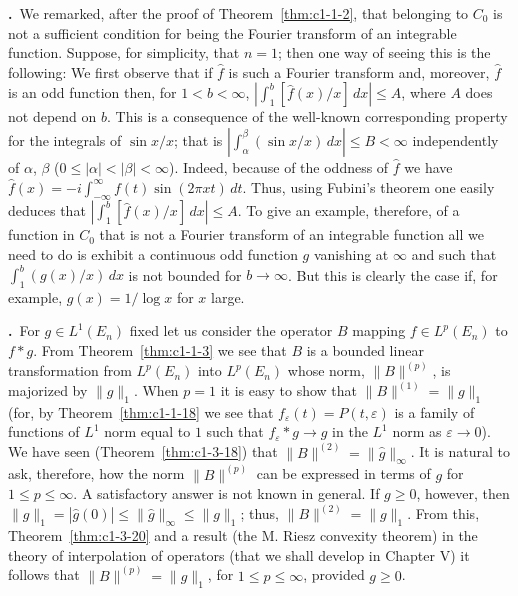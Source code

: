 \label{eq:c1-4-1}\textbf{\theequation.}~We remarked,
after the proof of Theorem~\ref{thm:c1-1-2}, that belonging to $C_{0}$ is not a
sufficient condition for being the Fourier transform of an integrable
function. Suppose, for simplicity, that $n = 1$; then one way of seeing this
is the following: We first observe that if $\hat{f}$ is such a Fourier
transform and, moreover, $\hat{f}$ is an odd function then, for
$1 < b < \infty$, $|\int_{1}^{b} [\hat{f}(x)/x] \, dx| \leq A$, where $A$ does
not depend on $b$. This is a consequence of the well-known corresponding
property for the integrals of $\sin x/x$; that is
$|\int_{\alpha}^{\beta} (\sin x/x) \, dx| \leq B < \infty$ independently of
$\alpha$, $\beta$ ($0 \leq |\alpha| < |\beta| < \infty$). Indeed, because of
the oddness of $\hat{f}$ we have
$\hat{f}(x) = -i \int_{-\infty}^{\infty} f(t) \sin (2\pi xt) \, dt$. Thus,
using Fubini's theorem one easily deduces that
$|\int_{1}^{b} [\hat{f}(x)/x] \, dx| \leq A$. To give an example, therefore, of
a function in $C_{0}$ that is not a Fourier transform of an integrable
function all we need to do is exhibit a continuous odd function $g$ vanishing
at $\infty$ and such that $\int_{1}^{b} (g(x)/x) \, dx$ is not bounded for
$b \to \infty$. But this is clearly the case if, for example,
$g(x) = 1/\log x$ for $x$ large.

\label{eq:c1-4-2}\textbf{\theequation.}~For
$g \in L^{1}(E_{n})$ fixed let us consider the operator $B$ mapping
$f \in L^{p}(E_{n})$ to $f * g$. From Theorem~\ref{thm:c1-1-3} we see that $B$
is a bounded linear transformation from $L^{p}(E_{n})$ into $L^{p}(E_{n})$
whose norm, $\|B\|^{(p)}$, is majorized by $\|g\|_{1}$. When $p = 1$ it is easy
to show that $\|B\|^{(1)} = \|g\|_{1}$ (for, by Theorem~\ref{thm:c1-1-18} we
see that $f_{\varepsilon}(t) = P(t, \varepsilon)$ is a family of functions of
$L^{1}$ norm equal to $1$ such that $f_{\varepsilon} * g \to g$ in the $L^{1}$
norm as $\varepsilon \to 0$). We have seen (Theorem~\ref{thm:c1-3-18}) that
$\|B\|^{(2)} = \|\hat{g}\|_{\infty}$. It is natural to ask, therefore, how the
norm $\|B\|^{(p)}$ can be expressed in terms of $g$ for $1 \leq p \leq \infty$.
A satisfactory answer is not known in general. If $g \geq 0$, however, then
$\|g\|_{1} = |\hat{g}(0)| \leq \|\hat{g}\|_{\infty} \leq \|g\|_{1}$; thus,
$\|B\|^{(2)} = \|g\|_{1}$. From this, Theorem~\ref{thm:c1-3-20} and a result
(the M. Riesz convexity theorem) in the theory of interpolation of operators
(that we shall develop in Chapter V) it follows that $\|B\|^{(p)} = \|g\|_{1}$,
for $1 \leq p \leq \infty$, provided $g \geq 0$.

